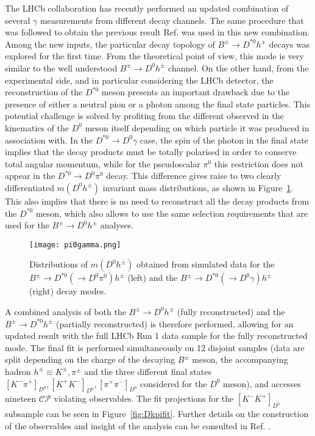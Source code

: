 \documentclass[12pt]{article}
\begin{document}
The LHCb collaboration has recently performed an updated combination of several $\gamma$ measurements from different decay channels. The same procedure that was followed to obtain the previous result Ref. \cite{prevgamma} was used in this new combination. Among the new inputs, the particular decay topology of $B^\pm \rightarrow D^{*0}h^\pm$ decays was explored for the first time. From the theoretical point of view, this mode is very similar to the well understood $B^\pm \rightarrow D^{0}h^\pm$ channel. On the other hand, from the experimental side, and in particular considering the LHCb detector, the reconstruction of the $D^{*0}$ meson presents an important drawback due to the presence of either a neutral pion or a photon among the final state particles. This potential challenge is solved by profiting from the different observed in the kinematics of the $D^0$ meson itself depending on which particle it was produced in association with. In the $D^{*0}\rightarrow D^0\gamma$ case, the spin of the photon in the final state implies that the decay products must be totally polarised in order to conserve total angular momentum, while for the pseudoscalar $\pi^0$ this restriction does not appear in the $D^{*0}\rightarrow D^0\pi^0$ decay. This difference gives raise to two clearly differentiated $m(D^0h^\pm)$ invariant mass distributions, as shown in Figure~\ref{fig:gammapi0}. This also implies that there is no need to reconstruct all the decay products from the $D^{*0}$ meson, which also allows to use the same selection requirements that are used for the $B^\pm \rightarrow D^{0}h^\pm$ analyses.

\begin{figure}[htb]
\begin{center}
\texttt{[image: pi0gamma.png]}
\caption{Distributions of $m(D^0h^\pm)$ obtained from simulated data for the $B^\pm\rightarrow D^{*0}(\rightarrow D^0\pi^0)h^\pm$ (left) and the $B^\pm\rightarrow D^{*0}(\rightarrow D^0\gamma)h^\pm$ (right) decay modes.}
\label{fig:gammapi0}
\end{center}
\end{figure}

A combined analysis of both the $B^\pm \rightarrow D^{0}h^\pm$ (fully reconstructed) and the $B^\pm \rightarrow D^{*0}h^\pm$ (partially reconstructed) is therefore performed, allowing for an updated result with the full LHCb Run 1 data sample for the fully reconstructed mode. The final fit is performed simultaneously on 12 disjoint samples (data are split depending on the charge of the decaying $B^\pm$ meson, the accompanying hadron $h^\pm\equiv K^\pm, \pi^\pm$ and the three different final states $[K^-\pi^+]_{D^0}, [K^+K^-]_{D^0}, [\pi^+\pi^-]_{D^0}$ considered for the $D^0$ meson), and accesses nineteen $\mathcal{CP}$ violating observables. The fit projections for the $[K^-K^+]_{D^0}$ subsample can be seen in Figure~\ref{fig:Dkpifit}. Further details on the construction of the observables and insight of the analysis can be consulted in Ref. \cite{analysis1}.
\end{document}
